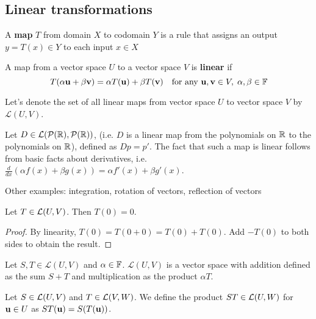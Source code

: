 \documentclass{article}
\begin{document}

\subsection{Linear transformations}
\begin{definition}
A \textbf{map} $T$ from domain $X$ to codomain $Y$ is a rule that assigns an output $y = T(x) \in Y$ to each input $x \in X$
\end{definition}

\begin{definition}
A map from a vector space $U$ to a vector space $V$ is \textbf{linear} if
\begin{equation*}
    T(\alpha {\mathbf{u}} + \beta {\mathbf{v}}) = \alpha T({\mathbf{u}}) + \beta T({\mathbf{v}}) \quad \text{for any } {\mathbf{u}}, {\mathbf{v}} \in V, \; \alpha, \beta \in {\mathbb{F}}
\end{equation*}
\end{definition}

Let's denote the set of all linear maps from vector space $U$ to vector space $V$ by $\mathcal{L}(U,V)$.

\begin{example}
\label{ex:diff_map}
Let $D \in \mathcal{L}(\mathcal{P}({\mathbb{R}}),\mathcal{P}({\mathbb{R}}))$, (i.e. $D$ is a linear map from the polynomials on ${\mathbb{R}}$ to  the polynomials on ${\mathbb{R}}$), defined as $Dp = p'$. The fact that such a map is linear follows from basic facts about derivatives, i.e. $\frac{d}{dx} (\alpha f(x) + \beta g(x)) = \alpha f'(x) + \beta g'(x)$.

\end{example}

Other examples: integration, rotation of vectors, reflection of vectors

\begin{lemma}
\label{lemm:map_0}
Let $T \in {\mathcal{L}}(U,V)$. Then $T(0) = 0$.
\end{lemma}
\begin{proof}
By linearity, $T(0) = T(0+0) = T(0) + T(0)$. Add $-T(0)$ to both sides to obtain the result.
\end{proof}


\begin{theorem}
Let $S,T \in \mathcal{L}(U,V)$ and $\alpha \in {\mathbb{F}}$. $\mathcal{L}(U,V)$ is a vector space with addition defined as the sum $S+T$ and multiplication as the product $\alpha T$.
\end{theorem}

\begin{definition}
Let $S \in {\mathcal{L}}(U,V)$ and $T \in {\mathcal{L}}(V,W)$. We define the product $ST \in {\mathcal{L}}(U,W)$ for ${\mathbf{u}}\in U$ as $ST({\mathbf{u}}) = S(T({\mathbf{u}}))$.
\end{definition}
\end{document}
